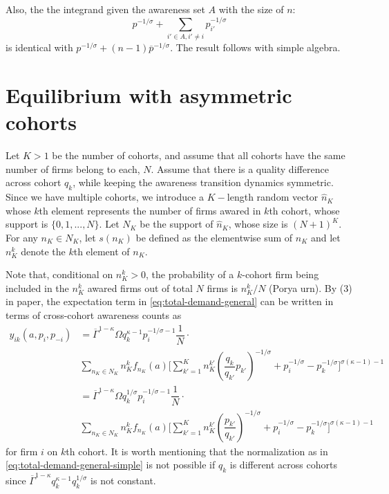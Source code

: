 \documentclass[12pt]{article}
\theoremstyle{definition}
\begin{document}
Also, the the integrand given the awareness set $A$ with the size of $n$: 
$$
p^{-1/\sigma} + \sum_{i' \in A, i' \neq i} p_{i'}^{-1/\sigma}
$$
is identical with $p ^{-1/\sigma} + (n-1) \overline{p}^{-1/\sigma}$. The result follows with simple algebra.


\section{Equilibrium with asymmetric cohorts}
Let $K > 1$ be the number of cohorts, and assume that all cohorts have the same number of firms belong to each, $N$. Assume that there is a quality difference across cohort $q_{k}$, while keeping the awareness transition dynamics symmetric.  Since we have multiple cohorts, we introduce a $K-$length random vector $\widehat n_K$ whose $k$th element represents the number of firms awared in $k$th cohort, whose support is $\{0, 1,..., N\}$. Let $N_K$ be the support of $\widehat  n_K$, whose size is $(N+1)^K$.  For any $n_K \in N_K$, let $s(n_K)$ be defined as the elementwise sum of $n_K$ and let $n_K^k$ denote the $k$th element of $n_K$.

Note that, conditional on $n^k_K > 0$, the probability of a $k$-cohort firm being included in the $n^k_K$ awared firms out of total $N$ firms is $n^k_K/N$ (Porya urn). By (3) in paper, the expectation term in \autoref{eq:total-demand-general} can be written in terms of cross-cohort awareness counts as
\begin{equation}
\begin{aligned}
y_{ik}(a, p_i, p_{-i}) &=  \overline{\Gamma}^{1 - \kappa} \Omega q_k^{\kappa-1} p_i^{-1/\sigma-1} \dfrac{1}{N} \cdot \\ 
&\sum_{ n_K \in N_K } n^k_K f_{n_K}(a) \Bigg[ \sum_{k' =1 }^K n_K^{k'} \left( \dfrac{q_k}{q_{k'}} p_{k'} \right)^{-1/\sigma} +   
 p_i^{-1/\sigma}   - p^{-1/\sigma}_{k}  \Bigg]^{\sigma(\kappa-1) -1}  \\ 
 &=  \overline{\Gamma}^{1 - \kappa} \Omega q_k^{1/\sigma} p_i^{-1/\sigma-1} \dfrac{1}{N} \cdot \\ 
 &\sum_{ n_K \in N_K } n^k_K f_{n_K}(a) \Bigg[ \sum_{k' =1 }^K n_K^{k'} \left( \dfrac{p_{k'}}{q_{k'}}  \right)^{-1/\sigma} +   
 p_i^{-1/\sigma}   - p^{-1/\sigma}_{k}  \Bigg]^{\sigma(\kappa-1) -1}
\end{aligned}
\end{equation}
for firm $i$ on $k$th cohort. It is worth mentioning that the normalization as in \autoref{eq:total-demand-general-simple} is not possible if $q_k$ is different across cohorts  since $\overline{\Gamma}^{1-\kappa}  q_k^{\kappa-1} q_k^{1/\sigma}$ is not constant.
\end{document}
